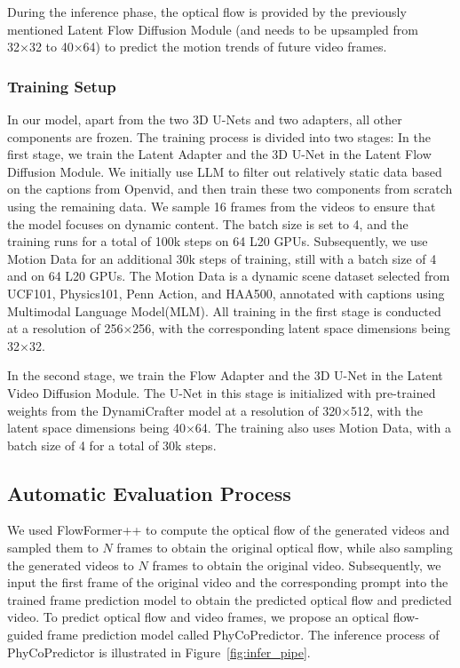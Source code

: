 During the inference phase, the optical flow is provided by the previously mentioned Latent Flow Diffusion Module (and needs to be upsampled from 32×32 to 40×64) to predict the motion trends of future video frames.

\subsubsection{Training Setup}

In our model, apart from the two 3D U-Nets and two adapters, all other components are frozen. The training process is divided into two stages: In the first stage, we train the Latent Adapter and the 3D U-Net in the Latent Flow Diffusion Module. We initially use LLM\cite{qwen2} to filter out relatively static data based on the captions from Openvid\cite{openvid}, and then train these two components from scratch using the remaining data. We sample 16 frames from the videos to ensure that the model focuses on dynamic content. The batch size is set to 4, and the training runs for a total of 100k steps on 64 L20 GPUs. Subsequently, we use Motion Data for an additional 30k steps of training, still with a batch size of 4 and on 64 L20 GPUs. The Motion Data is a dynamic scene dataset selected from UCF101\cite{ucf101}, Physics101\cite{phys101}, Penn Action\cite{pennaction}, and HAA500\cite{haa500}, annotated with captions using Multimodal Language Model(MLM). All training in the first stage is conducted at a resolution of 256×256, with the corresponding latent space dimensions being 32×32.

In the second stage, we train the Flow Adapter and the 3D U-Net in the Latent Video Diffusion Module. The U-Net in this stage is initialized with pre-trained weights from the DynamiCrafter model at a resolution of 320×512, with the latent space dimensions being 40×64. The training also uses Motion Data, with a batch size of 4 for a total of 30k steps.

\subsection{Automatic Evaluation Process}


We used FlowFormer++\cite{shi2023flowformer++} to compute the optical flow of the generated videos and sampled them to \( N \) frames to obtain the original optical flow, while also sampling the generated videos to \( N \) frames to obtain the original video. Subsequently, we input the first frame of the original video and the corresponding prompt into the trained frame prediction model to obtain the predicted optical flow and predicted video. To predict optical flow and video frames, we propose an optical flow-guided frame prediction model called PhyCoPredictor. The inference process of PhyCoPredictor is illustrated in Figure~\ref{fig:infer_pipe}.



